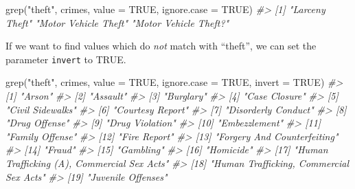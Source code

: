 \documentclass[
]{krantz}
\makeatletter
\newenvironment{Shaded}{\begin{snugshade}}{\end{snugshade}}
\newcommand{\AttributeTok}[1]{\textcolor[rgb]{0.61,0.61,0.61}{#1}}
\newcommand{\CommentTok}[1]{\textcolor[rgb]{0.37,0.37,0.37}{\textit{#1}}}
\newcommand{\ConstantTok}[1]{\textcolor[rgb]{0,0,0}{#1}}
\newcommand{\FunctionTok}[1]{\textcolor[rgb]{0,0,0}{#1}}
\newcommand{\NormalTok}[1]{#1}
\newcommand{\StringTok}[1]{\textcolor[rgb]{0.5,0.5,0.5}{#1}}
\newenvironment{kframe}{%
\medskip{}
\setlength{\fboxsep}{.8em}
 \def\at@end@of@kframe{}%
 \ifinner\ifhmode%
  \def\at@end@of@kframe{\end{minipage}}%
  \begin{minipage}{\columnwidth}%
 \fi\fi%
 \def\FrameCommand##1{\hskip\@totalleftmargin \hskip-\fboxsep
 \colorbox{shadecolor}{##1}\hskip-\fboxsep
     \hskip-\linewidth \hskip-\@totalleftmargin \hskip\columnwidth}%
 \MakeFramed {\advance\hsize-\width
   \@totalleftmargin\z@ \linewidth\hsize
   \@setminipage}}%
 {\par\unskip\endMakeFramed%
 \at@end@of@kframe}
\renewenvironment{Shaded}{\begin{kframe}}{\end{kframe}}
\makeatother
\begin{document}
\begin{Shaded}
\begin{Highlighting}[]
\FunctionTok{grep}\NormalTok{(}\StringTok{"theft"}\NormalTok{, crimes, }\AttributeTok{value =} \ConstantTok{TRUE}\NormalTok{, }\AttributeTok{ignore.case =} \ConstantTok{TRUE}\NormalTok{)}
\CommentTok{\#\textgreater{} [1] "Larceny Theft"        "Motor Vehicle Theft"  "Motor Vehicle Theft?"}
\end{Highlighting}
\end{Shaded}

If we want to find values which do \emph{not} match with ``theft'', we can set the parameter \texttt{invert} to TRUE.

\begin{Shaded}
\begin{Highlighting}[]
\FunctionTok{grep}\NormalTok{(}\StringTok{"theft"}\NormalTok{, crimes, }\AttributeTok{value =} \ConstantTok{TRUE}\NormalTok{, }\AttributeTok{ignore.case =} \ConstantTok{TRUE}\NormalTok{, }\AttributeTok{invert =} \ConstantTok{TRUE}\NormalTok{)}
\CommentTok{\#\textgreater{}  [1] "Arson"                                     }
\CommentTok{\#\textgreater{}  [2] "Assault"                                   }
\CommentTok{\#\textgreater{}  [3] "Burglary"                                  }
\CommentTok{\#\textgreater{}  [4] "Case Closure"                              }
\CommentTok{\#\textgreater{}  [5] "Civil Sidewalks"                           }
\CommentTok{\#\textgreater{}  [6] "Courtesy Report"                           }
\CommentTok{\#\textgreater{}  [7] "Disorderly Conduct"                        }
\CommentTok{\#\textgreater{}  [8] "Drug Offense"                              }
\CommentTok{\#\textgreater{}  [9] "Drug Violation"                            }
\CommentTok{\#\textgreater{} [10] "Embezzlement"                              }
\CommentTok{\#\textgreater{} [11] "Family Offense"                            }
\CommentTok{\#\textgreater{} [12] "Fire Report"                               }
\CommentTok{\#\textgreater{} [13] "Forgery And Counterfeiting"                }
\CommentTok{\#\textgreater{} [14] "Fraud"                                     }
\CommentTok{\#\textgreater{} [15] "Gambling"                                  }
\CommentTok{\#\textgreater{} [16] "Homicide"                                  }
\CommentTok{\#\textgreater{} [17] "Human Trafficking (A), Commercial Sex Acts"}
\CommentTok{\#\textgreater{} [18] "Human Trafficking, Commercial Sex Acts"    }
\CommentTok{\#\textgreater{} [19] "Juvenile Offenses"                         }

\end{Highlighting}
\end{Shaded}
\end{document}
